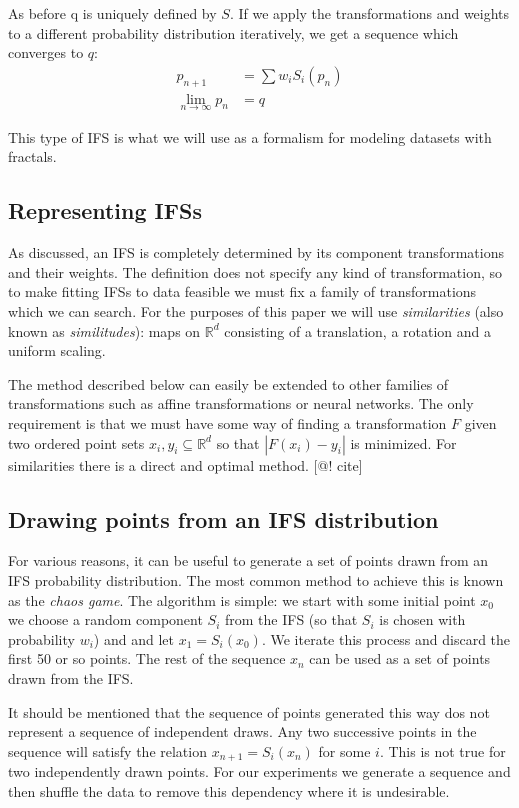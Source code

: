 \documentclass[10pt]{article}
\theoremstyle{definition}
\begin{document}
As before q is uniquely defined by $S$. If we apply the transformations and weights to a different probability distribution iteratively, we get a sequence which converges to $q$:
\begin{align*}
p_{n+1} &= \sum w_i S_i(p_n) \\
\lim_{n \rightarrow \infty} p_n &= q 
\end{align*}

This type of IFS is what we will use as a formalism for modeling datasets with fractals.

\subsection{Representing IFSs}

As discussed, an IFS is completely determined by its component transformations and their weights. The definition does not specify any kind of transformation, so to make fitting IFSs to data feasible we must fix a family of transformations which we can search. For the purposes of this paper we will use \emph{similarities} (also known as \emph{similitudes}): maps on ${\mathbb R}^d$ consisting of a translation, a rotation and a uniform scaling.

The method described below can easily be extended to other families of transformations such as affine transformations or neural networks. The only requirement is that we must have some way of finding a transformation $F$ given two ordered point sets ${x_i}, {y_i} \subseteq {\mathbb R}^d$ so that $|F(x_i) - y_i|$ is minimized. For similarities there is a direct and optimal method. [@! cite]

\subsection{Drawing points from an IFS distribution}

For various reasons, it can be useful to generate a set of points drawn from an IFS probability distribution. The most common method to achieve this is known as the \emph{chaos game}. The algorithm is simple: we start with some initial point $x_0$ we choose a random component $S_i$ from the IFS (so that $S_i$ is chosen with probability $w_i$) and and let $x_1 = S_i(x_0)$. We iterate this process and discard the first 50 or so points. The rest of the sequence $x_n$ can be used as a set of points drawn from the IFS.

It should be mentioned that the sequence of points generated this way dos not represent a sequence of independent draws. Any two successive points in the sequence will satisfy the relation $x_{n+1} = S_i(x_{n})$ for some $i$. This is not true for two independently drawn points. For our experiments we generate a sequence and then shuffle the data to remove this dependency where it is undesirable.
\end{document}
